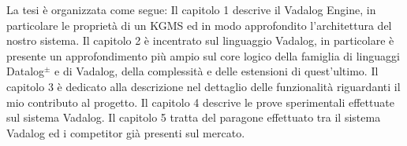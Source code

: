 La tesi è organizzata come segue: \newline \newline
Il capitolo 1 descrive il Vadalog Engine, in particolare le proprietà di un KGMS ed in modo approfondito l'architettura del nostro sistema. \newline \newline
Il capitolo 2 è incentrato sul linguaggio Vadalog, in particolare è presente un approfondimento più ampio sul core logico della famiglia di linguaggi Datalog$^\pm$ e di Vadalog, della complessità e delle estensioni di quest'ultimo. \newline \newline
Il capitolo 3 è dedicato alla descrizione nel dettaglio delle funzionalità riguardanti il mio contributo al progetto. \newline \newline
Il capitolo 4 descrive le prove sperimentali effettuate sul sistema Vadalog. \newline \newline
Il capitolo 5 tratta del paragone effettuato tra il sistema Vadalog ed i competitor già presenti sul mercato.
